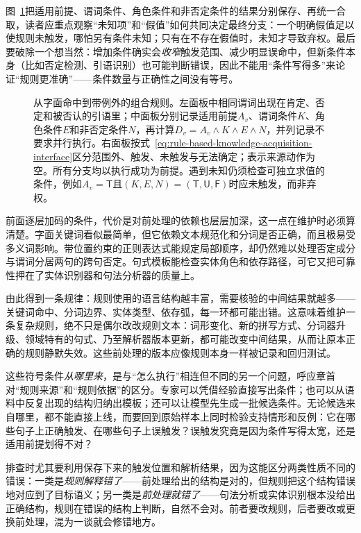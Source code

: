 图~\ref{fig:rule-based-knowledge-acquisition-pattern-rule}把适用前提、谓词条件、角色条件和非否定条件的结果分别保存、再统一合取，读者应重点观察“未知项”和“假值”如何共同决定最终分支：一个明确假值足以使规则未触发，哪怕另有条件未知；只有在不存在假值时，未知才导致弃权。最后要破除一个想当然：增加条件确实会\emph{收窄}触发范围、减少明显误命中，但新条件本身（比如否定检测、引语识别）也可能判断错误，因此不能用“条件写得多”来论证“规则更准确”——条件数量与正确性之间没有等号。

\begin{figure}[htbp]
  \centering
  
  \caption{从字面命中到带例外的组合规则。左面板中相同谓词出现在肯定、否定和被否认的引语里；中面板分别记录适用前提$A_v$、谓词条件$K$、角色条件$E$和非否定条件$N$，再计算$D_v=A_v\land K\land E\land N$，并列记录不要求并行执行。右面板按式~\eqref{eq:rule-based-knowledge-acquisition-interface}区分范围外、触发、未触发与无法确定；\textemdash{}表示来源动作为空。所有分支均以执行成功为前提。遇到未知仍须检查可独立求值的条件，例如$A_v=\mathsf{T}$且$(K,E,N)=(\mathsf{T},\mathsf{U},\mathsf{F})$时应未触发，而非弃权。}
  \label{fig:rule-based-knowledge-acquisition-pattern-rule}
\end{figure}

前面逐层加码的条件，代价是对前处理的依赖也层层加深，这一点在维护时必须算清楚。字面关键词看似最简单，但它依赖文本规范化和分词是否正确，而且极易受多义词影响。带位置约束的正则表达式能规定局部顺序，却仍然难以处理否定成分与谓词分居两句的跨句否定。句式模板能检查实体角色和依存路径，可它又把可靠性押在了实体识别器和句法分析器的质量上。

由此得到一条规律：规则使用的语言结构越丰富，需要核验的中间结果就越多——关键词命中、分词边界、实体类型、依存弧，每一环都可能出错。这意味着维护一条复杂规则，绝不只是偶尔改改规则文本：词形变化、新的拼写方式、分词器升级、领域特有的句式、乃至解析器版本更新，都可能改变中间结果，从而让原本正确的规则静默失效。这些前处理的版本应像规则本身一样被记录和回归测试。

这些符号条件\emph{从哪里来}，是与“怎么执行”相连但不同的另一个问题，呼应章首对“规则来源”和“规则依据”的区分。专家可以凭借经验直接写出条件；也可以从语料中反复出现的结构归纳出模板；还可以让模型先生成一批候选条件。无论候选来自哪里，都不能直接上线，而要回到原始样本上同时检验支持情形和反例：它在哪些句子上正确触发、在哪些句子上误触发？误触发究竟是因为条件写得太宽，还是适用前提划得不对？

排查时尤其要利用保存下来的触发位置和解析结果，因为这能区分两类性质不同的错误：一类是\emph{规则解释错了}——前处理给出的结构是对的，但规则把这个结构错误地对应到了目标语义；另一类是\emph{前处理就错了}——句法分析或实体识别根本没给出正确结构，规则在错误的结构上判断，自然不会对。前者要改规则，后者要改或更换前处理，混为一谈就会修错地方。

